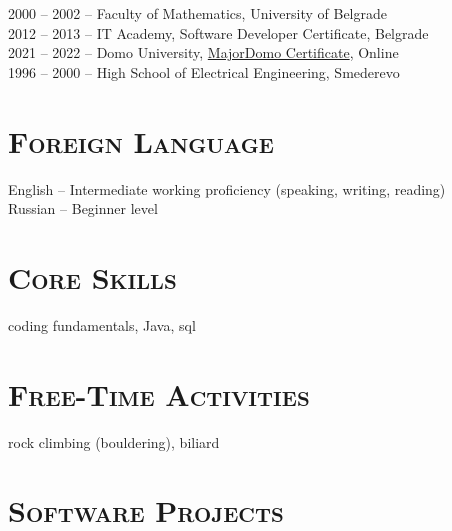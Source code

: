 \documentclass[12pt]{article}
\begin{document}
    2000 -- 2002 -- Faculty of Mathematics, University of Belgrade \\
    2012 -- 2013 -- IT Academy, Software Developer Certificate, Belgrade \\
    2021 -- 2022 -- Domo University, \href{https://drive.google.com/file/d/1i-GzyE43WospitxXdFWp2bRYe6wqZG48/view?usp=sharing}{MajorDomo Certificate}, Online \\
    1996 -- 2000 -- High School of Electrical Engineering, Smederevo

\section{\textsc{Foreign Language}} 

    English -- Intermediate working proficiency (speaking, writing, reading) \\
    Russian -- Beginner level

\section{\textsc{Core Skills}}
 
    coding fundamentals, Java, sql

\section{\textsc{Free-Time Activities}}

    rock climbing (bouldering), biliard

\pagebreak

\section{\textsc{Software Projects}}
\end{document}
